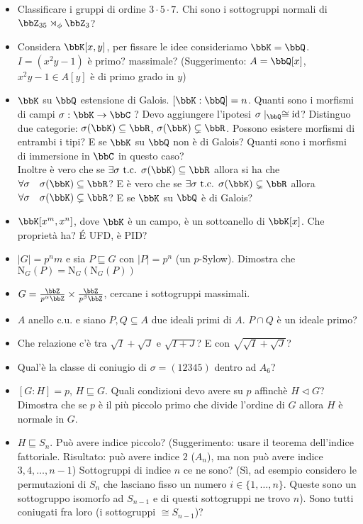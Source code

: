 \documentclass[a4paper,11pt,NoNotes,GeneralMath]{stdmdoc}
\newcommand{\sgr}{\sqsubseteq}
\newcommand{\nrm}{\lhd}
\begin{document}
\begin{itemize}
		\item Classificare i gruppi di ordine $3 \cdot 5 \cdot 7$. Chi sono i sottogruppi normali di $\bbZ_{35} \rtimes_\phi \bbZ_3$?
		\item Considera $\bbK [x,y]$, per fissare le idee consideriamo $\bbK = \bbQ$. $I = (x^2y -1)$ è primo? massimale? (Suggerimento: $A = \bbQ [x]$, $x^2y-1 \in A[y]$ è di primo grado in $y$)
		\item $\bbK$ su $\bbQ$ estensione di Galois. $[ \bbK : \bbQ ] = n$. Quanti sono i morfismi di campi $\sigma: \bbK \rar \bbC$ ? Devo aggiungere l'ipotesi $\sigma\mid_\bbQ \cong \Id$? Distinguo due categorie: $\sigma(\bbK) \subseteq \bbR$, $\sigma(\bbK) \subsetneq \bbR$. Possono esistere morfismi di entrambi i tipi? E se $\bbK$ su $\bbQ$ non è di Galois? Quanti sono i morfismi di immersione in $\bbC$ in questo caso? \\
		Inoltre è vero che se $\exists \sigma \tc \sigma(\bbK) \subseteq \bbR$ allora si ha che $\forall \sigma \quad \sigma(\bbK) \subseteq \bbR$? E è vero che se $\exists \sigma \tc \sigma(\bbK) \subsetneq \bbR$ allora $\forall \sigma \quad \sigma(\bbK) \subsetneq \bbR$? E se $\bbK$ su $\bbQ$ è di Galois?
		\item $\bbK [x^m, x^n]$, dove $\bbK$ è un campo, è un sottoanello di $\bbK [x]$. Che proprietà ha? \'E UFD, è PID?
		\item $\mid G \mid = p^n m$ e sia $P \sgr G$ con $\mid P \mid = p^n$ (un $p$-Sylow). Dimostra che $\text{N}_G(P) = \text{N}_G(\text{N}_G(P))$
		\item $G = \frac{\bbZ}{p^\alpha \bbZ} \times \frac{\bbZ}{p^\beta \bbZ}$, cercane i sottogruppi massimali.
		\item $A$ anello c.u. e siano $P, Q \subseteq A$ due ideali primi di $A$. $P \cap Q$ è un ideale primo?
		\item Che relazione c'è tra $\sqrt{I} + \sqrt{J}$ e $\sqrt{I + J}$? E con $\sqrt{\sqrt{I} + \sqrt{J}}$?
		\item Qual'è la classe di coniugio di $\sigma = (1 2 3 4 5)$ dentro ad $A_6$?
		\item $[G: H] = p$, $H \sgr G$. Quali condizioni devo avere su $p$ affinchè $H \nrm G$? Dimostra che se $p$ è il più piccolo primo che divide l'ordine di $G$ allora $H$ è normale in $G$.
		\item $H \sgr S_n$. Può avere indice piccolo? (Suggerimento: usare il teorema dell'indice fattoriale. Risultato: può avere indice $2$ ($A_n$), ma non può avere indice $3, 4, \ldots, n-1$) Sottogruppi di indice $n$ ce ne sono? (Sì, ad esempio considero le permutazioni di $S_n$ che lasciano fisso un numero $i \in \{ 1, \ldots, n \}$. Queste sono un sottogruppo isomorfo ad $S_{n-1}$ e di questi sottogruppi ne trovo $n$). Sono tutti coniugati fra loro (i sottogruppi $\cong S_{n-1}$)? \\

\end{itemize}
\end{document}
